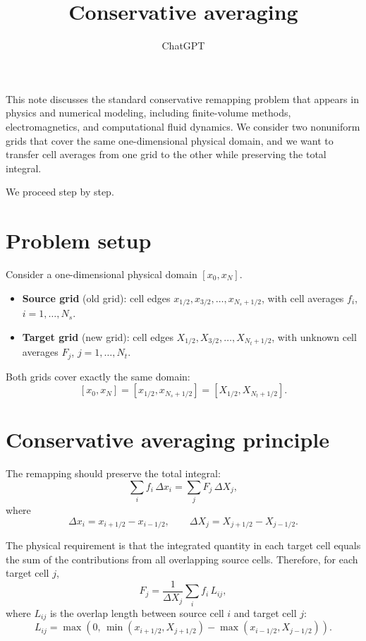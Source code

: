 \documentclass[a4paper,10pt]{article}
\title{Conservative averaging}
\author{ChatGPT}
\begin{document}
\maketitle

This note discusses the standard conservative remapping problem that appears in physics and numerical modeling, including finite-volume methods, electromagnetics, and computational fluid dynamics. We consider two nonuniform grids that cover the same one-dimensional physical domain, and we want to transfer cell averages from one grid to the other while preserving the total integral.

We proceed step by step.

\section{Problem setup}

Consider a one-dimensional physical domain $[x_0,x_N]$.

\begin{itemize}
  \item \textbf{Source grid} (old grid): cell edges
  $x_{1/2}, x_{3/2}, \dots, x_{N_s+1/2}$,
  with cell averages $f_i$, $i=1,\dots,N_s$.

  \item \textbf{Target grid} (new grid): cell edges
  $X_{1/2}, X_{3/2}, \dots, X_{N_t+1/2}$,
  with unknown cell averages $F_j$, $j=1,\dots,N_t$.
\end{itemize}

Both grids cover exactly the same domain:
\[
[x_0,x_N] = [x_{1/2},x_{N_s+1/2}] = [X_{1/2},X_{N_t+1/2}].
\]

\section{Conservative averaging principle}

The remapping should preserve the total integral:
\begin{equation}
\sum_i f_i\,\Delta x_i = \sum_j F_j\,\Delta X_j,
\end{equation}
where
\[
\Delta x_i = x_{i+1/2} - x_{i-1/2},
\qquad
\Delta X_j = X_{j+1/2} - X_{j-1/2}.
\]

The physical requirement is that the integrated quantity in each target cell equals the sum of the contributions from all overlapping source cells. Therefore, for each target cell $j$,
\begin{equation}
F_j = \frac{1}{\Delta X_j} \sum_i f_i\,L_{ij},
\end{equation}
where $L_{ij}$ is the overlap length between source cell $i$ and target cell $j$:
\begin{equation}
L_{ij} = \max\!\left(0,\, \min(x_{i+1/2},X_{j+1/2}) - \max(x_{i-1/2},X_{j-1/2})\right).
\end{equation}
\end{document}
